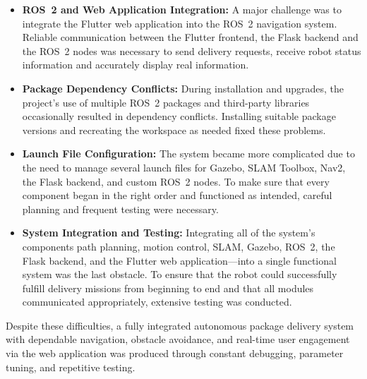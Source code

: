 \begin{itemize}
\item \textbf{ROS~2 and Web Application Integration:}
A major challenge was to integrate the Flutter web application into the ROS~2 navigation system. Reliable communication between the Flutter frontend, the Flask backend and the ROS~2 nodes was necessary to send delivery requests, receive robot status information and accurately display real information.


\item \textbf{Package Dependency Conflicts:}
During installation and upgrades, the project's use of multiple ROS~2 packages and third-party libraries occasionally resulted in dependency conflicts. Installing suitable package versions and recreating the workspace as needed fixed these problems.


\item \textbf{Launch File Configuration:}
The system became more complicated due to the need to manage several launch files for Gazebo, SLAM Toolbox, Nav2, the Flask backend, and custom ROS~2 nodes. To make sure that every component began in the right order and functioned as intended, careful planning and frequent testing were necessary.

\item \textbf{System Integration and Testing:}
Integrating all of the system's components path planning, motion control, SLAM, Gazebo, ROS~2, the Flask backend, and the Flutter web application—into a single functional system was the last obstacle. To ensure that the robot could successfully fulfill delivery missions from beginning to end and that all modules communicated appropriately, extensive testing was conducted.


\end{itemize}

Despite these difficulties, a fully integrated autonomous package delivery system with dependable navigation, obstacle avoidance, and real-time user engagement via the web application was produced through constant debugging, parameter tuning, and repetitive testing.


